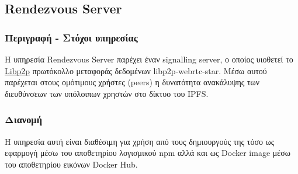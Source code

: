 \subsection{Rendezvous Server} \label{subsection:4-3-7-rendezvous-server-service}

\subsubsection{Περιγραφή - Στόχοι υπηρεσίας}

Η υπηρεσία Rendezvous Server παρέχει έναν signalling server, ο οποίος υιοθετεί το \hyperref[subsection:4-2-4-3-libp2p]{Libp2p} πρωτόκολλο μεταφοράς δεδομένων libp2p-webrtc-star. Μέσω αυτού παρέχεται στους ομότιμους χρήστες (peers) η δυνατότητα ανακάλυψης των διευθύνσεων των υπόλοιπων χρηστών στο δίκτυο του IPFS.

\subsubsection{Διανομή}

Η υπηρεσία αυτή είναι διαθέσιμη για χρήση από τους δημιουργούς της τόσο ως εφαρμογή μέσω του αποθετηρίου λογισμικού npm αλλά και ως Docker image μέσω του αποθετηρίου εικόνων Docker Hub.